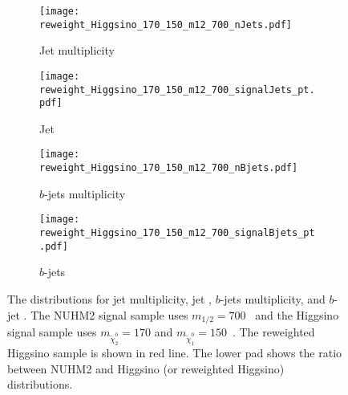 \begin{figure}[htbp]
    \begin{center}
        \begin{subfigure}[b]{0.48\textwidth}
            \texttt{[image: reweight\_Higgsino\_170\_150\_m12\_700\_nJets.pdf]}
            \caption{Jet multiplicity}
        \end{subfigure}
        \begin{subfigure}[b]{0.48\textwidth}
            \texttt{[image: reweight\_Higgsino\_170\_150\_m12\_700\_signalJets\_pt.pdf]}
            \caption{Jet \pt}
        \end{subfigure}
        \begin{subfigure}[b]{0.48\textwidth}
            \texttt{[image: reweight\_Higgsino\_170\_150\_m12\_700\_nBjets.pdf]}
            \caption{$b$-jets multiplicity}
        \end{subfigure}
        \begin{subfigure}[b]{0.48\textwidth}
            \texttt{[image: reweight\_Higgsino\_170\_150\_m12\_700\_signalBjets\_pt.pdf]}
            \caption{$b$-jets \pt}
        \end{subfigure}
    \end{center}
    \caption{The distributions for jet multiplicity, jet \pt, $b$-jets multiplicity, and $b$-jet \pt.
    The NUHM2 signal sample uses  $m_{1/2} = 700$~{\GeV} and the Higgsino signal sample uses $m_{\widetilde{\chi}^{0}_{2}} = 170$ and $m_{\widetilde{\chi}^{0}_{1}} = 150$~{\GeV}.
    The reweighted Higgsino sample is shown in red line.
    The lower pad shows the ratio between NUHM2 and Higgsino (or reweighted Higgsino) distributions.}
    \label{fig:results_nuhm2_reweighting_validation_2}
\end{figure}

